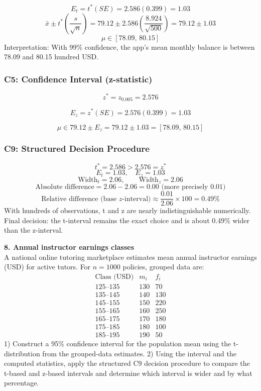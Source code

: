 \begin{ExamProblems}
		\[
		E_t=t^*(SE)=2.586(0.399)=1.03
		\]
		\[
		\bar{x}\pm t^*\left(\frac{s}{\sqrt{n}}\right)=79.12\pm 2.586\left(\frac{8.924}{\sqrt{500}}\right)=79.12\pm 1.03
		\]
		\[
		\mu\in[78.09,\,80.15]
		\]
		Interpretation: With 99\% confidence, the app's mean monthly balance is between 78.09 and 80.15 hundred USD.

		\subsubsection*{C5: Confidence Interval (z-statistic)}
		\[
		z^*=z_{0.005}=2.576
		\]

		\[
		E_z=z^*(SE)=2.576(0.399)=1.03
		\]

		\[
		\mu\in 79.12\pm E_z=79.12\pm 1.03=[78.09,\,80.15]
		\]

		\subsubsection*{C9: Structured Decision Procedure}
		\[
		t^*=2.586>2.576=z^*
		\]
		\[
		E_t=1.03,\quad E_z=1.03
		\]
		\[
		\text{Width}_t=2.06,\qquad \text{Width}_z=2.06
		\]
		\[
		\text{Absolute difference}=2.06-2.06=0.00\text{ (more precisely }0.01\text{)}
		\]
		\[
		\text{Relative difference (base }z\text{-interval)}\approx\frac{0.01}{2.06}\times 100=0.49\%
		\]
		With hundreds of observations, t and z are nearly indistinguishable numerically.
		Final decision: the t-interval remains the exact choice and is about 0.49\% wider than the z-interval.

		\newpage
		\item
		\textbf{8. Annual instructor earnings classes}\\
		A national online tutoring marketplace estimates mean annual instructor earnings (USD) for active tutors.
		For $n=1000$ policies, grouped data are:
		\[
		\begin{array}{c|c|c}
		\text{Class (USD)} & m_i & f_i\\\hline
		125\text{--}135 & 130 & 70\\
		135\text{--}145 & 140 & 130\\
		145\text{--}155 & 150 & 220\\
		155\text{--}165 & 160 & 250\\
		165\text{--}175 & 170 & 180\\
		175\text{--}185 & 180 & 100\\
		185\text{--}195 & 190 & 50
		\end{array}
		\]
		1) Construct a 95\% confidence interval for the population mean using the t-distribution from the grouped-data estimates.
		2) Using the interval and the computed statistics, apply the structured C9 decision procedure to compare the t-based and z-based intervals and determine which interval is wider and by what percentage.


\end{ExamProblems}
